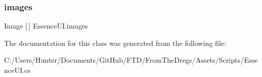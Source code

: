 \mbox{\label{class_essence_u_i_a08b6afcc69283f73676b25f7d3faea16}} 
\subsubsection{\texorpdfstring{images}{images}}
{\footnotesize\ttfamily Image \mbox{[}$\,$\mbox{]} Essence\+U\+I.\+images\hspace{0.3cm}{\ttfamily [get]}}



The documentation for this class was generated from the following file\+:\begin{DoxyCompactItemize}
\item 
C\+:/\+Users/\+Hunter/\+Documents/\+Git\+Hub/\+F\+T\+D/\+From\+The\+Dregs/\+Assets/\+Scripts/Essence\+U\+I.\+cs\end{DoxyCompactItemize}
